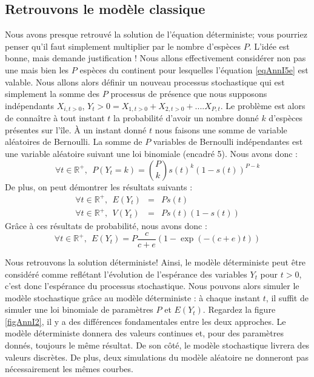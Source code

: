 \subsection{Retrouvons le modèle classique}
Nous avons presque retrouvé la solution de l'équation déterministe; vous pourriez penser qu'il faut simplement multiplier par le nombre d'espèces $P$. L'idée est bonne, mais demande justification ! Nous allons effectivement considérer non pas une mais bien les $P$ espèces du continent pour lesquelles l'équation \eqref{eqAnnI5e} est valable. Nous allons alors définir un nouveau processus stochastique qui est simplement la somme des $P$ processus de présence que nous supposons indépendants $X_{i,t>0}$, $Y_t>0=X_{1,t>0}+X_{2,t>0}+....X_{P,t}$. Le problème est alors de connaître à tout instant $t$ la probabilité d'avoir un nombre donné $k$ d'espèces présentes sur l'île. À un instant donné $t$ nous faisons une somme de variable aléatoires de Bernoulli. La somme de $P$ variables de Bernoulli indépendantes est une variable aléatoire suivant une loi binomiale (encadré 5). Nous avons donc :
\begin{equation}
 \forall t \in \mathbb{R}^+, ~~\label{eqAnnI6a} P(Y_t=k)=\binom{P}{k}s(t)^k(1-s(t))^{P-k}
\end{equation}
De plus, on peut démontrer les résultats suivants :
\begin{eqnarray}
 \forall t \in \mathbb{R}^+, ~~\label{eqAnnI6b} E(Y_t)&=&Ps(t) \\
 \forall t \in \mathbb{R}^+, ~~\label{eqAnnI6c} V(Y_t)&=&Ps(t)(1-s(t))
\end{eqnarray}
Grâce à ces résultats de probabilité, nous avons donc :
\begin{equation}
 \forall t \in \mathbb{R}^+, ~~\label{eqAnnI6d} E(Y_t)=P\frac{c}{c+e}(1-\exp(-(c+e)t))
\end{equation}

Nous retrouvons la solution déterministe! Ainsi, le modèle déterministe peut être considéré comme reflétant l'évolution de l'espérance des variables $Y_t$ pour $t>0$, c'est donc l'espérance du processus stochastique. Nous pouvons alors simuler le modèle stochastique grâce au modèle déterministe : à chaque instant $t$, il suffit de simuler une loi binomiale de paramètres $P$ et $E(Y_t)$. Regardez la figure \ref{figAnnI2}, il y a des différences fondamentales entre les deux approches. Le modèle déterministe donnera des valeurs continues et, pour des paramètres donnés, toujours le même résultat. De son côté, le modèle stochastique livrera des valeurs discrètes. De plus, deux simulations du modèle aléatoire ne donneront pas nécessairement les mêmes courbes.

